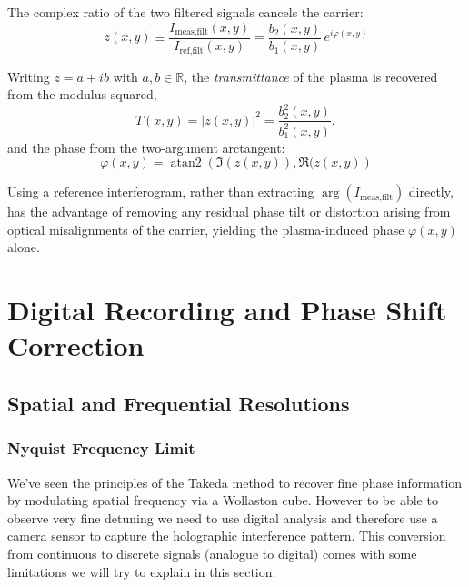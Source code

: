 \documentclass[11pt,a4paper]{article}
\begin{document}
The complex ratio of the two filtered signals cancels the carrier:
\begin{equation}
z(x,y) \equiv \frac{I_{\text{meas,filt}}(x,y)}{I_{\text{ref,filt}}(x,y)} = \frac{b_2(x,y)}{b_1(x,y)}\,e^{i\varphi(x,y)}
\end{equation}

Writing $z = a + ib$ with $a, b \in \mathbb{R}$, the \emph{transmittance} of the plasma is recovered from the modulus squared,
\begin{equation}
T(x,y) = |z(x,y)|^2 = \frac{b_2^2(x,y)}{b_1^2(x,y)},
\end{equation}
and the phase from the two-argument arctangent:
\begin{equation}
\boxed{\ \varphi(x,y) = \operatorname{atan2}(\Im{(z(x,y))},\Re{(z(x,y)})\ }
\end{equation}

Using a reference interferogram, rather than extracting $\arg(I_{\text{meas,filt}})$ directly, has the advantage of removing any residual phase tilt or distortion arising from optical misalignments of the carrier, yielding the plasma-induced phase $\varphi(x,y)$ alone.
\section{Digital Recording and Phase Shift Correction}
\usetikzlibrary{decorations.pathmorphing, arrows.meta, angles, quotes}

\subsection{Spatial and Frequential Resolutions}
\subsubsection{Nyquist Frequency Limit}
We've seen the principles of the Takeda method to recover fine phase information by modulating spatial frequency via a Wollaston cube. However to be able to observe very fine detuning we need to use digital analysis and therefore use a camera sensor to capture the holographic interference pattern. 
This conversion from continuous to discrete signals (analogue to digital) comes with some limitations we will try to explain in this section.
\end{document}
